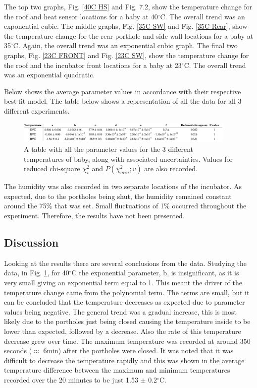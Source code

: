 \documentclass{article}
\begin{document}
The top two graphs, Fig. \ref{40C HS} and Fig. 7.2,  show the temperature change for the roof and heat sensor locations for a baby at 40$^{\circ}$C. The overall trend was an exponential cubic. The middle graphs, Fig. \ref{35C SW} and Fig. \ref{35C Rear}, show the temperature change for the rear porthole and side wall locations for a baby at 35$^{\circ}$C. Again, the overall trend was an exponential cubic graph. The final two graphs, Fig. \ref{23C FRONT} and Fig. \ref{23C SW}, show the temperature change for the roof and the incubator front locations for a baby at 23$^{\circ}$C. The overall trend was an exponential quadratic.

\vspace{3mm}

Below shows the average parameter values in accordance with their respective best-fit model. The table below shows a representation of all the data for all 3 different experiments.

\begin{figure}[!h]
    \centering
    \captionsetup{justification=centering,margin=1cm}
    \includegraphics[width=0.95\textwidth]{Table Servo.png}
    \caption{A table with all the parameter values for the 3 different temperatures of baby, along with associated uncertainties. Values for reduced chi-square $\chi^{2}_{v}$ and $P(\chi^{2}_{min};v)$ are also recorded.}
    \label{Table servo}
\end{figure}

The humidity was also recorded in two separate locations of the incubator. As expected, due to the portholes being shut, the humidity remained constant around the 75\% that was set. Small fluctuations of 1\% occurred throughout the experiment. Therefore, the results have not been presented.

\subsection{Discussion}
\vspace{3mm}
Looking at the results there are several conclusions from the data. Studying the data, in Fig. \ref{Table servo}, for 40$^{\circ}$C the exponential parameter, b, is insignificant, as it is very small giving an exponential term equal to 1. This meant the driver of the temperature change came from the polynomial term. The terms are small, but it can be concluded that the temperature decreases as expected due to parameter values being negative. The general trend was a gradual increase, this is most likely due to the portholes just being closed causing the temperature inside to be lower than expected, followed by a decrease. Also the rate of this temperature decrease grew over time. The maximum temperature was recorded at around 350 seconds ($\approx$ 6min) after the portholes were closed. It was noted that it was difficult to decrease the temperature rapidly and this was shown in the average temperature difference between the maximum and minimum temperatures recorded over the 20 minutes to be just 1.53 $\pm$ 0.2$^{\circ}$C. 
 
\end{document}
